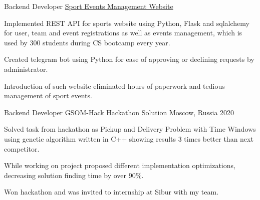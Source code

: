 

\begin{cventries}

  \cventry
  {Backend Developer} %
  {\href{https://github.com/SphericalPotatoInVacuum/lksh_sport}{Sport Events Management Website}} %
  {} %
  {} %
  {
    \begin{cvitems} %
      \item Implemented REST API for sports website using Python, Flask and sqlalchemy for user,
      team and event registrations as well as events management, which is used by 300 students during CS bootcamp every year.
      \item Created telegram bot using Python for ease of approving or declining requests by administrator.
      \item Introduction of such website eliminated hours of paperwork and tedious management of sport events.
    \end{cvitems}
  }


  \cventry
  {Backend Developer} %
  {GSOM-Hack Hackathon Solution} %
  {Moscow, Russia} %
  {2020} %
  {
    \begin{cvitems}
      \item Solved task from hackathon as Pickup and Delivery Problem with Time Windows using
      genetic algorithm written in C++ showing results 3 times better than next competitor.
      \item While working on project proposed different implementation optimizations, decreasing solution finding time by over 90\%.
      \item Won hackathon and was invited to internship at Sibur with my team.
    \end{cvitems}
  }
\end{cventries}
